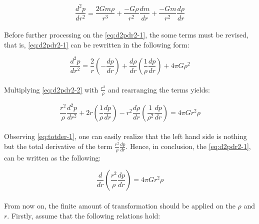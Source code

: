 \documentclass[letterpaper,12pt]{article}
\begin{document}
\begin{equation}
    \label{eq:d2pdr2-1}
    \frac{d^2p}{dr^2} = \frac{2Gm\rho}{r^3} + \frac{-G\rho}{r^2}\frac{dm}{dr} + \frac{-Gm}{r^2}\frac{d\rho}{dr}
\end{equation}

\paragraph{} Before further processing on the \eqref{eq:d2pdr2-1}, the some terms must be revised, that is, \eqref{eq:d2pdr2-1} can be rewritten in the following form:

\begin{equation}
    \label{eq:d2pdr2-2}
    \frac{d^2p}{dr^2} = \frac{2}{r}\left(-\frac{dp}{dr}\right) + \frac{d\rho}{dr}\left(\frac{1}{\rho}\frac{dp}{dr}\right) + 4\pi G \rho^2
\end{equation}

\paragraph{}Multiplying \eqref{eq:d2pdr2-2} with $\frac{r^2}{\rho}$ and rearranging the terms yields:

\begin{equation}
    \label{eq:totder-1}
    \frac{r^2}{\rho}\frac{d^2p}{dr^2} + 2r\left(\frac{1}{\rho}\frac{dp}{dr}\right) - r^2\frac{d\rho}{dr}\left(\frac{1}{\rho^2}\frac{dp}{dr}\right) = 4\pi G r^2 \rho
\end{equation}

\paragraph{}Observing \eqref{eq:totder-1}, one can easily realize that the left hand side is nothing but the total derivative of the term $\frac{r^2}{\rho}\frac{dp}{dr}$. Hence, in conclusion, the \eqref{eq:d2pdr2-1}, can be written as the following:

\begin{equation}
    \label{eq:totder-2}
    \frac{d}{dr}\left(\frac{r^2}{\rho}\frac{dp}{dr}\right) = 4\pi G r^2 \rho
\end{equation}

\paragraph{} From now on, the finite amount of transformation should be applied on the $\rho$ and $r$. Firstly, assume that the following relations hold:
\end{document}
